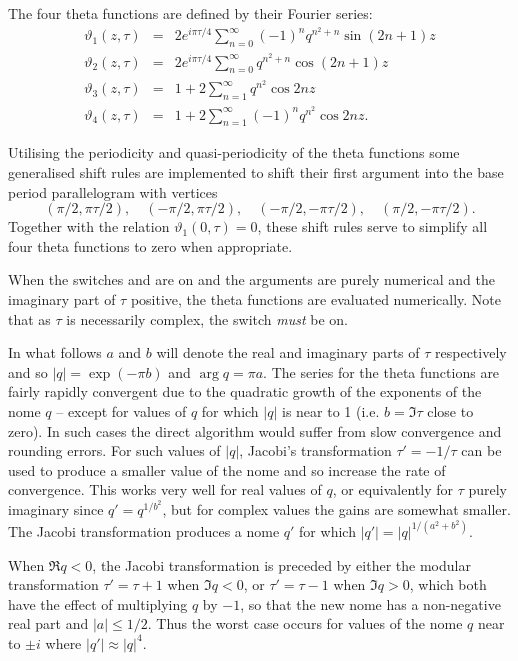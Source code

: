 The four theta functions are defined by their Fourier series:
\begin{eqnarray*}
  \vartheta_1(z,\tau) & = & 2 e^{i\pi\tau/4}\sum_{n=0}^\infty (-1)^nq^{n^2+n} \sin(2n+1)z\\
\vartheta_2(z,\tau) & = & 2 e^{i\pi\tau/4}\sum_{n=0}^\infty q^{n^2+n} \cos(2n+1)z\\
\vartheta_3(z,\tau) & = & 1 +2\sum_{n=1}^\infty q^{n^2} \cos 2n z\\
\vartheta_4(z,\tau) & = & 1 +2\sum_{n=1}^\infty (-1)^n q^{n^2} \cos 2n z.
\end{eqnarray*}

Utilising the periodicity and quasi-periodicity of the theta functions
some generalised shift rules are implemented to shift their first argument
into the base period parallelogram with vertices
\[(\pi/2, \pi\tau/2),\quad (-\pi/2, \pi\tau/2),\quad (-\pi/2, -\pi\tau/2),
\quad (\pi/2, -\pi\tau/2).\]
Together with the relation $\vartheta_1(0,\tau)=0$,  these shift rules serve to
simplify all four theta functions to zero when appropriate.

When the switches  and  are on and the arguments are
purely numerical and the imaginary part of $\tau$ positive,
the theta functions are evaluated numerically. Note that as $\tau$ is
necessarily complex, the switch  \emph{must} be on.

In what follows $a$ and $b$ will denote the real and imaginary parts of
$\tau$ respectively and so $|q| = \exp(-\pi b)$ and $\arg q =\pi a$.
The series for the theta functions are fairly rapidly convergent
due to the quadratic growth of the exponents of the nome $q$ -- except
for values of $q$ for which $|q|$ is near to 1
(i.e. $b=\Im \tau $ close to zero).
In such cases the direct algorithm would suffer from slow convergence and
rounding errors.
For such values of $|q|$, Jacobi's transformation $\tau'=-1/\tau$ can be
used to produce a smaller value of the nome and so increase the rate of
convergence.
This works very well for real values of $q$, or equivalently for $\tau$ purely
imaginary since $q'= q^{1/b^2}$, but for complex
values the gains are somewhat smaller. The Jacobi transformation produces a
nome $q'$ for which $|q'| =  |q|^{1/(a^2+b^2)}$.

When $\Re q < 0$, the Jacobi transformation is preceded by either the
modular transformation $\tau' = \tau+1$ when $\Im q < 0$, or $\tau' = \tau-1$
when $\Im q > 0$, which both have the effect  of multiplying $q$ by $-1$,
so that the new nome has a non-negative real part and $|a| \leq 1/2$.
Thus the worst case occurs for values of the nome $q$ near to $\pm i$ where
$|q'| \approx |q|^4$.

